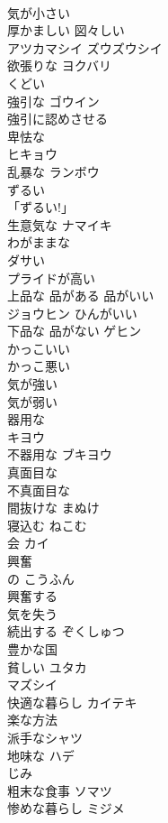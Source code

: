 \documentclass[8pt]{extreport}
\begin{document}
\begin{CJK}{UTF8}{min}
\\	気が小さい	
\\	厚かましい 図々しい	
\\	アツカマシイ ズウズウシイ
\\	欲張りな	ヨクバリ 
\\	くどい	
\\	強引な	ゴウイン 
\\	強引に認めさせる 
\\	卑怯な	
\\	ヒキョウ
\\	乱暴な	ランボウ 
\\	ずるい 
\\	「ずるい!」	
\\	生意気な	ナマイキ 
\\	わがままな	
\\	ダサい	
\\	プライドが高い	
\\	上品な 品がある 品がいい	
\\	ジョウヒン ひんがいい
\\	下品な 品がない	ゲヒン 
\\	かっこいい	
\\	かっこ悪い	
\\	気が強い	
\\	気が弱い	
\\	器用な	
\\	キヨウ
\\	不器用な	ブキヨウ 
\\	真面目な	
\\	不真面目な	
\\	間抜けな	まぬけ 
\\	寝込む	ねこむ 
\\	会	カイ 
\\	興奮
\\	の	こうふん 
\\	興奮する 
\\	気を失う	
\\	続出する	ぞくしゅつ 
\\	豊かな国　
\\	貧しい	ユタカ　
\\	マズシイ 
\\	快適な暮らし	カイテキ 
\\	楽な方法	
\\	派手なシャツ　
\\	地味な	ハデ　
\\	じみ 
\\	粗末な食事	ソマツ 
\\	惨めな暮らし	ミジメ 

\end{CJK}
\end{document}
